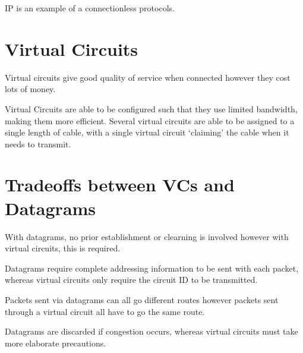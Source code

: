 IP is an example of a connectionless protocols. 

\section*{Virtual Circuits}

Virtual circuits give good quality of service when connected however they cost lots of money.

Virtual Circuits are able to be configured such that they use limited bandwidth, making them more efficient. Several virtual circuits are able to be assigned to a single length of cable, with a single virtual circuit `claiming' the cable when it needs to transmit.

\section*{Tradeoffs between VCs and Datagrams}
With datagrams, no prior establishment or clearning is involved however with virtual circuits, this is required.

Datagrams require complete addressing information to be sent with each packet, whereas virtual circuits only require the circuit ID to be transmitted.

Packets sent via datagrams can all go different routes however packets sent through a virtual circuit all have to go the same route.

Datagrams are discarded if congestion occurs, whereas virtual circuits must take more elaborate precautions.